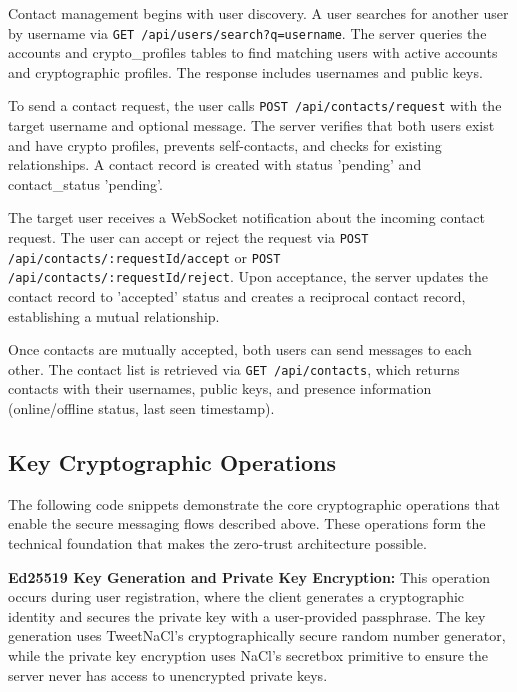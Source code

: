 \documentclass[12pt,a4paper,openany]{book}
\begin{document}
Contact management begins with user discovery. A user searches for another user by username via \texttt{GET /api/users/}\allowbreak\texttt{search?q=username}. The server queries the accounts and crypto\_profiles tables to find matching users with active accounts and cryptographic profiles. The response includes usernames and public keys.

To send a contact request, the user calls \texttt{POST /api/contacts/}\allowbreak\texttt{request} with the target username and optional message. The server verifies that both users exist and have crypto profiles, prevents self-contacts, and checks for existing relationships. A contact record is created with status 'pending' and contact\_status 'pending'.

The target user receives a WebSocket notification about the incoming contact request. The user can accept or reject the request via \texttt{POST /api/contacts/}\allowbreak\texttt{:requestId/accept} or \texttt{POST /api/contacts/}\allowbreak\texttt{:requestId/reject}. Upon acceptance, the server updates the contact record to 'accepted' status and creates a reciprocal contact record, establishing a mutual relationship.

Once contacts are mutually accepted, both users can send messages to each other. The contact list is retrieved via \texttt{GET /api/}\allowbreak\texttt{contacts}, which returns contacts with their usernames, public keys, and presence information (online/offline status, last seen timestamp).

\subsection{Key Cryptographic Operations}

The following code snippets demonstrate the core cryptographic operations that enable the secure messaging flows described above. These operations form the technical foundation that makes the zero-trust architecture possible.

\textbf{Ed25519 Key Generation and Private Key Encryption:} This operation occurs during user registration, where the client generates a cryptographic identity and secures the private key with a user-provided passphrase. The key generation uses TweetNaCl's cryptographically secure random number generator, while the private key encryption uses NaCl's secretbox primitive to ensure the server never has access to unencrypted private keys.
\end{document}
